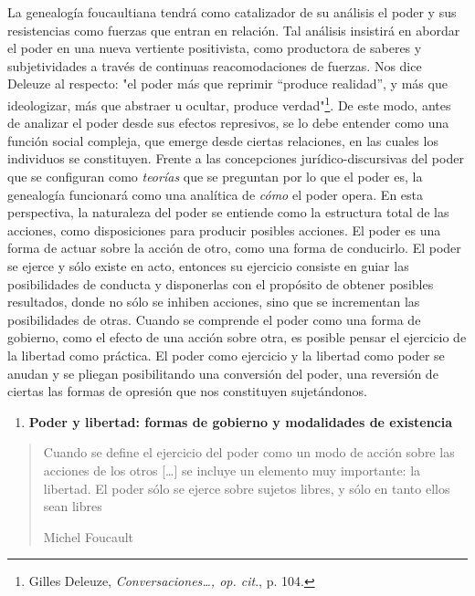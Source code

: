 \documentclass{book}
\begin{document}
La genealogía foucaultiana tendrá como catalizador de su análisis el
poder y sus resistencias como fuerzas que entran en relación. Tal
análisis insistirá en abordar el poder en una nueva vertiente
positivista, como productora de saberes y subjetividades a través de
continuas reacomodaciones de fuerzas. Nos dice Deleuze al respecto: "el
poder más que reprimir ``produce realidad'', y más que ideologizar, más
que abstraer u ocultar, produce verdad"\footnote{Gilles Deleuze,
  \emph{Conversaciones\ldots, op. cit}., p. 104.}. De este modo, antes
de analizar el poder desde sus efectos represivos, se lo debe entender
como una función social compleja, que emerge desde ciertas relaciones,
en las cuales los individuos se constituyen. Frente a las concepciones
jurídico-discursivas del poder que se configuran como \emph{teorías} que
se preguntan por lo que el poder es, la genealogía funcionará como una
analítica de \emph{cómo} el poder opera. En esta perspectiva, la
naturaleza del poder se entiende como la estructura total de las
acciones, como disposiciones para producir posibles acciones. El poder
es una forma de actuar sobre la acción de otro, como una forma de
conducirlo. El poder se ejerce y sólo existe en acto, entonces su
ejercicio consiste en guiar las posibilidades de conducta y disponerlas
con el propósito de obtener posibles resultados, donde no sólo se
inhiben acciones, sino que se incrementan las posibilidades de otras.
Cuando se comprende el poder como una forma de gobierno, como el efecto
de una acción sobre otra, es posible pensar el ejercicio de la libertad
como práctica. El poder como ejercicio y la libertad como poder se
anudan y se pliegan posibilitando una conversión del poder, una
reversión de ciertas las formas de opresión que nos constituyen
sujetándonos.

\begin{enumerate}
\def\labelenumi{\arabic{enumi}.}
\setcounter{enumi}{3}
\item
  \textbf{Poder y libertad: formas de gobierno y modalidades de
  existencia}
\end{enumerate}

\begin{quote}
Cuando se define el ejercicio del poder como un modo de acción sobre las
acciones de los otros {[}\ldots{]} se incluye un elemento muy
importante: la libertad. El poder sólo se ejerce sobre sujetos libres, y
sólo en tanto ellos sean libres

Michel Foucault
\end{quote}
\end{document}
